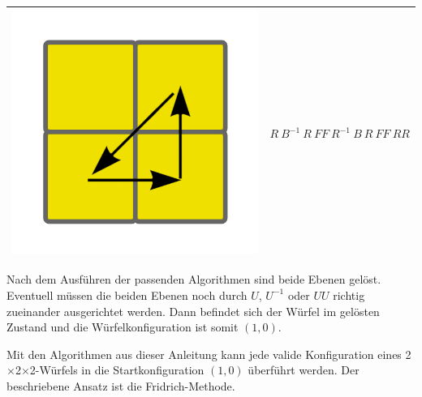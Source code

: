 \documentclass[12pt,a4paper, usenames, dvipsnames]{article}
\theoremstyle{mystyle}
\theoremstyle{definition}
\newcommand{\Ttwo}{2$\times$2$\times$2-}
\begin{document}
\begin{center}
\begin{tabular}{m{4cm} m{8cm}}
\includegraphics[scale=0.08]{corners3.png}   & $R \ B^{-1} \ R \ FF \ R^{-1} \ B \ R \ FF \ RR $ \\
\bottomrule
\end{tabular}
\end{center}
%
%

Nach dem Ausführen der passenden Algorithmen sind beide Ebenen gelöst. Eventuell müssen die beiden Ebenen noch durch $U$, $U^{-1}$ oder $UU$ richtig zueinander ausgerichtet werden. Dann befindet sich der Würfel im gelösten Zustand und die Würfelkonfiguration ist somit $(1,0)$.

Mit den Algorithmen aus dieser Anleitung kann jede valide Konfiguration eines \Ttwo Würfels in die Startkonfiguration $(1,0)$ überführt werden. Der beschriebene Ansatz ist die Fridrich-Methode.

%
%
%
%
%
%
%
%
%
%
%
%
%
%
%
%
%
%
%
%
\newpage
\end{document}

